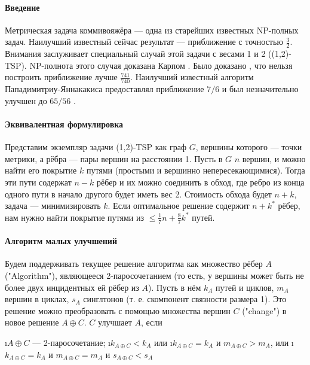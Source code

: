 

\date{}




%

\paragraph{Введение}
Метрическая задача коммивояжёра --- одна из старейших известных NP-полных задач. Наилучший известный сейчас результат --- приближение с точностью $\frac{3}{2}$\cite{C76}. Внимания заслуживает специальный случай этой задачи с весами 1 и 2 ((1,2)-TSP). NP-полнота этого случая доказана Карпом \cite{K72}. 
Было доказано \cite{EK01}, что нельзя построить приближение лучше $\frac{741}{740}$. Наилучший известный алгоритм Пападимитриу-Яннакакиса \cite{PY93} предоставлял приближение $7/6$ и был незначительно улучшен до $65/56$ \cite{BR05}. 
\paragraph{Эквивалентная формулировка}
Представим экземпляр задачи (1,2)-TSP как граф $G$, вершины которого --- точки метрики, а рёбра --- пары вершин на расстоянии 1. Пусть в $G$ $n$ вершин, и можно найти его покрытие $k$ путями (простыми и вершинно непересекающимися). Тогда эти пути содержат $n-k$ рёбер и их можно соединить в обход, где ребро из конца одного пути в начало другого будет иметь вес 2. Стоимость обхода будет $n+k$, задача --- минимизировать $k$. Если оптимальное решение содержит $n+k^*$ рёбер, нам нужно найти покрытие путями из $\le \frac{1}{7}n+\frac{8}{7}k^*$ путей.

\paragraph{Алгоритм малых улучшений}
Будем поддерживать текущее решение алгоритма как множество рёбер $A$ ("Algorithm"), являющееся 2-паросочетанием (то есть, у вершины может быть не более двух инцидентных ей рёбер из $A$). Пусть в нём $k_A$ путей и циклов, $m_A$ вершин в циклах, $s_A$ синглтонов (т. е. скомпонент связности размера 1). Это решение можно преобразовать с помощью множества вершин $C$ ("change") в новое решение $A \oplus C$. $C$ улучшает $A$, если 
\begin{enumerate}
	\i $A \oplus C$ --- 2-паросочетание;
	\i $k_{A \oplus C} < k_A$ или
	\i $k_{A \oplus C} = k_A$ и $m_{A \oplus C} > m_A$, или
	\i $k_{A \oplus C} = k_A$ и $m_{A \oplus C} = m_A$ и $s_{A \oplus C} < s_A$
\end{enumerate}

